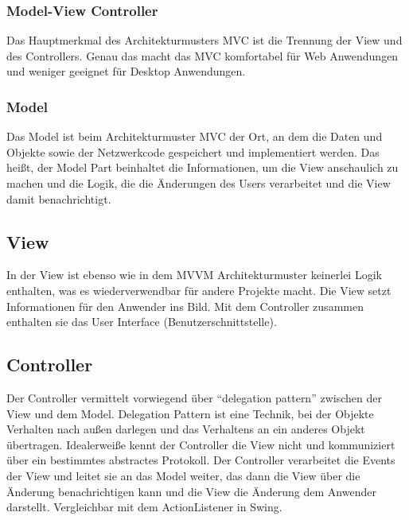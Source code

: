 \setcounter{secnumdepth}{3}
\subsubsection{Model-View Controller}
Das Hauptmerkmal des Architekturmusters \ac{MVC} ist die Trennung der View und des Controllers. Genau das macht das MVC komfortabel f\"ur Web Anwendungen und weniger geeignet f\"ur Desktop Anwendungen\cite{Syromiatnikov2014}.

\subsubsection*{Model}
Das Model ist beim Architekturmuster \ac{MVC} der Ort, an dem die Daten und Objekte sowie der Netzwerkcode gespeichert und implementiert werden. Das hei\ss{}t, der Model Part beinhaltet die Informationen, um die View anschaulich zu machen und die Logik, die die \"Anderungen des Users verarbeitet und die View damit benachrichtigt\cite{Leff2001}.
\subsection*{View}
In der View ist ebenso wie in dem \ac{MVVM} Architekturmuster keinerlei Logik enthalten, was es wiederverwendbar f\"ur andere Projekte macht.\cite{Peres2016} Die View setzt Informationen f\"ur den Anwender ins Bild. Mit dem Controller zusammen enthalten sie das User Interface (Benutzerschnittstelle)\cite{Leff2001}.
\subsection*{Controller}
Der Controller vermittelt vorwiegend \"uber \enquote{delegation pattern} zwischen der View und dem Model. Delegation Pattern ist eine Technik, bei der Objekte Verhalten nach au\ss{}en darlegen und das Verhaltens an ein anderes Objekt \"ubertragen\cite{TU-Wien2013}. Idealerwei\ss{}e kennt der Controller die View nicht und kommuniziert \"uber ein bestimmtes abstractes Protokoll\cite{Peres2016}.
Der Controller verarbeitet die Events der View und leitet sie an das Model weiter, das dann die View \"uber die \"Anderung benachrichtigen kann und die View die \"Anderung dem Anwender darstellt. Vergleichbar mit dem ActionListener in Swing\cite{Singer2004}.

